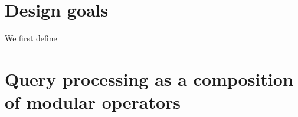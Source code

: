 \section{Design goals}
We first define 


\section{Query processing as a composition of modular operators}


